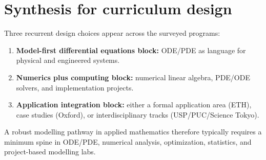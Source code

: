 ﻿\documentclass[11pt,a4paper]{article}
\begin{document}
\section{Synthesis for curriculum design}
Three recurrent design choices appear across the surveyed programs:
\begin{enumerate}[leftmargin=*]
  \item \textbf{Model-first differential equations block:} ODE/PDE as language for physical and engineered systems.
  \item \textbf{Numerics plus computing block:} numerical linear algebra, PDE/ODE solvers, and implementation projects.
  \item \textbf{Application integration block:} either a formal application area (ETH), case studies (Oxford), or interdisciplinary tracks (USP/PUC/Science Tokyo).
\end{enumerate}

A robust modelling pathway in applied mathematics therefore typically requires a minimum spine in ODE/PDE, numerical analysis, optimization, statistics, and project-based modelling labs.
\end{document}
